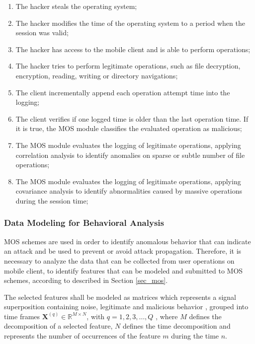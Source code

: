 \documentclass[twocolumn]{svjour3}          	%
\begin{document}
\begin{enumerate}[label=(\alph*)]
	\item The hacker steals the operating system;
	\item The hacker modifies the time of the operating system to a period when the session was valid;
	\item The hacker has access to the mobile client and is able to perform operations;
	\item The hacker tries to perform legitimate operations, such as file decryption, encryption, reading, writing or directory navigations;
	\item The client incrementally append each operation attempt time into the logging;
	\item The client verifies if one logged time is older than the last operation time. If it is true, the MOS module classifies the evaluated operation as malicious;
	\item The MOS module evaluates the logging of legitimate operations, applying correlation analysis to identify anomalies on sparse or subtle number of file operations;
	\item The MOS module evaluates the logging of legitimate operations, applying covariance analysis to identify abnormalities caused by massive operations during the session time;
\end{enumerate}

\subsubsection{Data Modeling for Behavioral Analysis }
\label{sec_data}

MOS schemes are used in order to identify anomalous behavior that can indicate an attack and be used to prevent or avoid attack propagation. Therefore, it is necessary to analyze the data that can be collected from user operations on mobile client, to identify features that can be modeled and submitted to MOS schemes, according to described in Section \ref{sec_mos}.

The selected features shall be modeled as matrices which represents a signal superposition containing noise, legitimate and malicious behavior \cite{tenorio2013greatest}, grouped into time frames $\mathbf{X}^{(q)} \in \mathbb{R}^{M\times{N}}$, with $q = 1, 2, 3, \ldots, Q$ , where $M$ defines the decomposition of a selected feature, $N$ defines the time decomposition and represents the number of occurrences of the feature $m$ during the time $n$.
\end{document}
